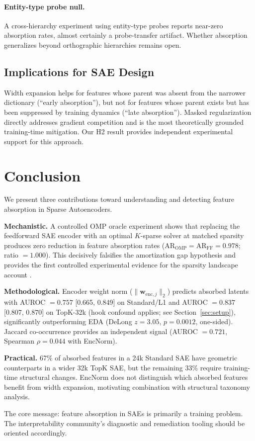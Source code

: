 \documentclass{article}
\begin{document}
\paragraph{Entity-type probe null.} A cross-hierarchy experiment using entity-type probes
reports near-zero absorption rates, almost certainly a probe-transfer artifact. Whether
absorption generalizes beyond orthographic hierarchies remains open.

\subsection{Implications for SAE Design}

Width expansion helps for features whose parent was absent from the narrower dictionary
(``early absorption''), but not for features whose parent exists but has been suppressed by
training dynamics (``late absorption''). Masked regularization \citep{narayanaswamy2026masked}
directly addresses gradient competition and is the most theoretically grounded training-time
mitigation. Our H2 result provides independent experimental support for this approach.

\section{Conclusion}

We present three contributions toward understanding and detecting feature absorption in Sparse
Autoencoders.

\textbf{Mechanistic.} A controlled OMP oracle experiment shows that replacing the feedforward
SAE encoder with an optimal $K$-sparse solver at matched sparsity produces zero reduction in
feature absorption rates ($\mathrm{AR}_\mathrm{OMP} = \mathrm{AR}_\mathrm{FF} = 0.978$;
ratio $= 1.000$). This decisively falsifies the amortization gap hypothesis and provides the
first controlled experimental evidence for the sparsity landscape account \citep{tang2024unified}.

\textbf{Methodological.} Encoder weight norm ($\|\mathbf{w}_{\mathrm{enc},j}\|_2$) predicts
absorbed latents with AUROC $= 0.757$ [0.665, 0.849] on Standard/L1 and AUROC $= 0.837$
[0.807, 0.870] on TopK-32k (hook confound applies; see Section~\ref{sec:setup}), significantly
outperforming EDA (DeLong $z=3.05$, $p=0.0012$, one-sided). Jaccard co-occurrence provides an
independent signal (AUROC $= 0.721$, Spearman $\rho=0.044$ with EncNorm).

\textbf{Practical.} 67\% of absorbed features in a 24k Standard SAE have geometric
counterparts in a wider 32k TopK SAE, but the remaining 33\% require training-time structural
changes. EncNorm does not distinguish which absorbed features benefit from width expansion,
motivating combination with structural taxonomy analysis.

The core message: feature absorption in SAEs is primarily a training problem. The
interpretability community's diagnostic and remediation tooling should be oriented accordingly.



\end{document}

